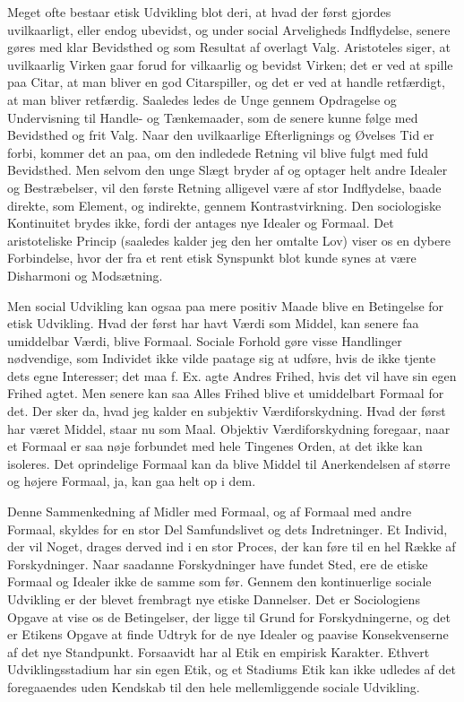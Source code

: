 \documentclass[12pt,a4paper,openany]{book}
\newcommand{\opage}[1]{\marginnote{\footnotesize\textit{[#1]}}}
\begin{document}
Meget ofte bestaar etisk Udvikling blot deri, at hvad der
først gjordes uvilkaarligt, eller endog ubevidst, og under social
Arveligheds Indflydelse, senere gøres med klar Bevidsthed og
som Resultat af overlagt Valg. Aristoteles siger, at uvilkaarlig
Virken gaar forud for vilkaarlig og bevidst Virken; det er ved
at spille paa Citar, at man bliver en god Citarspiller, og det
er ved at handle retfærdigt, at man bliver retfærdig. Saaledes
ledes de Unge gennem Opdragelse og Undervisning til Handle- og
Tænkemaader, som de senere kunne følge med Bevidsthed
og frit Valg. Naar den uvilkaarlige Efterlignings og Øvelses
Tid er forbi, kommer det an paa, om den indledede Retning
vil blive fulgt med fuld Bevidsthed. Men selvom den unge
Slægt bryder af og optager helt andre Idealer og Bestræbelser,
vil den første Retning alligevel være af stor Indflydelse, baade
direkte, som Element, og indirekte, gennem Kontrastvirkning.
Den sociologiske Kontinuitet brydes ikke, fordi der antages
nye Idealer og Formaal. Det aristoteliske Princip (saaledes
\setcounter{footnote}{0}%
\opage{70}kalder jeg den her omtalte Lov) viser os en dybere Forbindelse,
hvor der fra et rent etisk Synspunkt blot kunde synes
at være Disharmoni og Modsætning.

Men social Udvikling kan ogsaa paa mere positiv Maade
blive en Betingelse for etisk Udvikling. Hvad der først har
havt Værdi som Middel, kan senere faa umiddelbar Værdi, blive
Formaal. Sociale Forhold gøre visse Handlinger nødvendige,
som Individet ikke vilde paatage sig at udføre, hvis de ikke
tjente dets egne Interesser; det maa f. Ex. agte Andres Frihed,
hvis det vil have sin egen Frihed agtet. Men senere kan saa
Alles Frihed blive et umiddelbart Formaal for det. Der sker
da, hvad jeg kalder en subjektiv Værdiforskydning. Hvad der
først har været Middel, staar nu som Maal. Objektiv Værdiforskydning
foregaar, naar et Formaal er saa nøje forbundet
med hele Tingenes Orden, at det ikke kan isoleres. Det oprindelige
Formaal kan da blive Middel til Anerkendelsen af
større og højere Formaal, ja, kan gaa helt op i dem.

Denne Sammenkedning af Midler med Formaal, og af Formaal
med andre Formaal, skyldes for en stor Del Samfundslivet
og dets Indretninger. Et Individ, der vil Noget, drages
derved ind i en stor Proces, der kan føre til en hel Række af
Forskydninger. Naar saadanne Forskydninger have fundet Sted,
ere de etiske Formaal og Idealer ikke de samme som før.
Gennem den kontinuerlige sociale Udvikling er der blevet
frembragt nye etiske Dannelser. Det er Sociologiens Opgave
at vise os de Betingelser, der ligge til Grund for Forskydningerne,
og det er Etikens Opgave at finde Udtryk for de
nye Idealer og paavise Konsekvenserne af det nye Standpunkt.
Forsaavidt har al Etik en empirisk Karakter. Ethvert Udviklingsstadium
har sin egen Etik, og et Stadiums Etik kan ikke
udledes af det foregaaendes uden Kendskab til den hele mellemliggende
sociale Udvikling.
\end{document}

